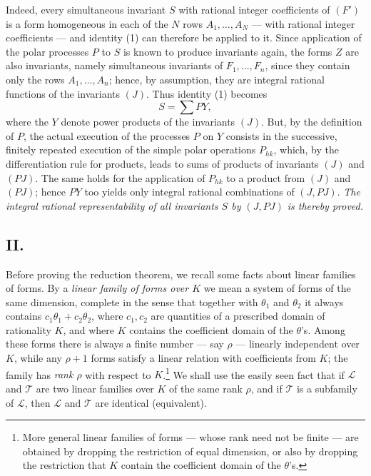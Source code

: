 \documentclass[11pt]{article}
\begin{document}
Indeed, every simultaneous invariant $S$ with rational integer coefficients of $(F')$ is a form homogeneous in each of the $N$ rows $A_1,
\ldots,A_N$ --- with rational integer coefficients --- and identity (1) can therefore be applied to it. Since application of the polar processes $P$ to $S$ is known to produce invariants again, the forms $Z$ are also invariants, namely simultaneous invariants of $F_1,
\ldots,F_n$, since they contain only the rows $A_1,
\ldots,A_n$; hence, by assumption, they are integral rational functions of the invariants $(J)$. Thus identity (1) becomes
\[
  S=\sum PY,
\]
where the $Y$ denote power products of the invariants $(J)$. But, by the definition of $P$, the actual execution of the processes $P$ on $Y$ consists in the successive, finitely repeated execution of the simple polar operations $P_{hk}$, which, by the differentiation rule for products, leads to sums of products of invariants $(J)$ and $(PJ)$. The same holds for the application of $P_{hk}$ to a product from $(J)$ and $(PJ)$; hence $PY$ too yields only integral rational combinations of $(J,PJ)$. \emph{The integral rational representability of all invariants $S$ by $(J,PJ)$ is thereby proved.}

\subsection*{II.}
Before proving the reduction theorem, we recall some facts about linear families of forms. By a \emph{linear family of forms over $K$} we mean a system of forms of the same dimension, complete in the sense that together with $\theta_1$ and $\theta_2$ it always contains $c_1\theta_1+c_2\theta_2$, where $c_1,c_2$ are quantities of a prescribed domain of rationality $K$, and where $K$ contains the coefficient domain of the $\theta$'s. Among these forms there is always a finite number --- say $\rho$ --- linearly independent over $K$, while any $\rho+1$ forms satisfy a linear relation with coefficients from $K$; the family has \emph{rank $\rho$} with respect to $K$.\footnote{More general linear families of forms --- whose rank need not be finite --- are obtained by dropping the restriction of equal dimension, or also by dropping the restriction that $K$ contain the coefficient domain of the $\theta$'s.} We shall use the easily seen fact that if $\mathcal L$ and $\mathcal T$ are two linear families over $K$ of the same rank $\rho$, and if $\mathcal T$ is a subfamily of $\mathcal L$, then $\mathcal L$ and $\mathcal T$ are identical (equivalent).
\end{document}
